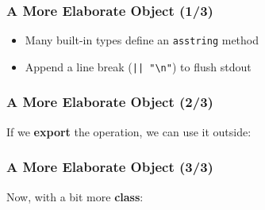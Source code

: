 \begin{frame}[fragile]

\frametitle{A More Elaborate Object (1/3)}


\begin{itemize}

\item Many built-in types define an \texttt{asstring} method

\item Append a line break (\lstinline{|| "\n"}) to flush stdout

\end{itemize}

\end{frame}

\begin{frame}[fragile]

\frametitle{A More Elaborate Object (2/3)}

If we \textbf{export} the operation, we can use it outside:


\end{frame}


\begin{frame}[fragile]

\frametitle{A More Elaborate Object (3/3)}

Now, with a bit more \textbf{class}:


\end{frame}
